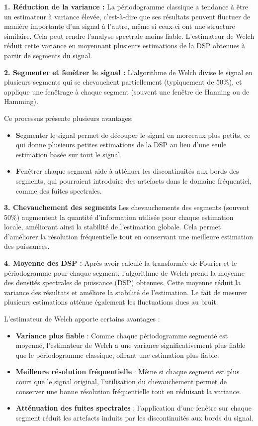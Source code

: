 \textbf{1. Réduction de la variance :}
La périodogramme classique a tendance à être un estimateur à variance élevée, c'est-à-dire que ses résultats peuvent fluctuer de manière importante d'un signal à l'autre, même si ceux-ci ont une structure similaire. 
Cela peut rendre l'analyse spectrale moins fiable. 
L'estimateur de Welch réduit cette variance en moyennant plusieurs estimations de la DSP obtenues à partir de segments du signal.

\textbf{2. Segmenter et fenêtrer le signal :}
L'algorithme de Welch divise le signal en plusieurs segments qui se chevauchent partiellement (typiquement de 50\%), et applique une fenêtrage à chaque segment (souvent une fenêtre de Hanning ou de Hamming). 

Ce processus présente plusieurs avantages:
\begin{itemize}
    \item \textbf Segmenter le signal permet de découper le signal en morceaux plus petits, ce qui donne plusieurs petites estimations de la DSP au lieu d'une seule estimation basée sur tout le signal.
    \item \textbf Fenêtrer chaque segment aide à atténuer les discontinuités aux bords des segments, qui pourraient introduire des artefacts dans le domaine fréquentiel, comme des fuites spectrales.
\end{itemize}

\textbf{3. Chevauchement des segments}
Les chevauchements des segments (souvent 50\%) augmentent la quantité d'information utilisée pour chaque estimation locale, améliorant ainsi la stabilité de l'estimation globale. 
Cela permet d'améliorer la résolution fréquentielle tout en conservant une meilleure estimation des puissances.

\textbf{4. Moyenne des DSP :}
Après avoir calculé la transformée de Fourier et le périodogramme pour chaque segment, l'algorithme de Welch prend la moyenne des densités spectrales de puissance (DSP) obtenues. 
Cette moyenne réduit la variance des résultats et améliore la stabilité de l'estimation. 
Le fait de mesurer plusieurs estimations atténue également les fluctuations dues au bruit.

L'estimateur de Welch apporte certains avantages : 
\begin{itemize}
    \item  \textbf{Variance plus fiable} : Comme chaque périodogramme segmenté est moyenné, l'estimateur de Welch a une variance significativement plus fiable que le périodogramme classique, offrant une estimation plus fiable.
    \item \textbf{Meilleure résolution fréquentielle} : Même si chaque segment est plus court que le signal original, l'utilisation du chevauchement permet de conserver une bonne résolution fréquentielle tout en réduisant la variance.
    \item  \textbf{Atténuation des fuites spectrales} : l'application d'une fenêtre sur chaque segment réduit les artefacts induits par les discontinuités aux bords du signal.
\end{itemize}

